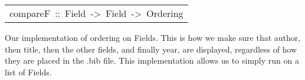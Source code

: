 \begin{haddockdesc}
\item[\begin{tabular}{@{}l}
compareF\ ::\ Field\ ->\ Field\ ->\ Ordering
\end{tabular}]\haddockbegindoc
Our implementation of ordering on Fields. This is how we make sure
 that author, then title, then the other fields, and finally year, are 
 displayed, regardless of how they are placed in the .bib file. This implementation
 allows us to simply run  on a list of Fields. 
\par

\end{haddockdesc}